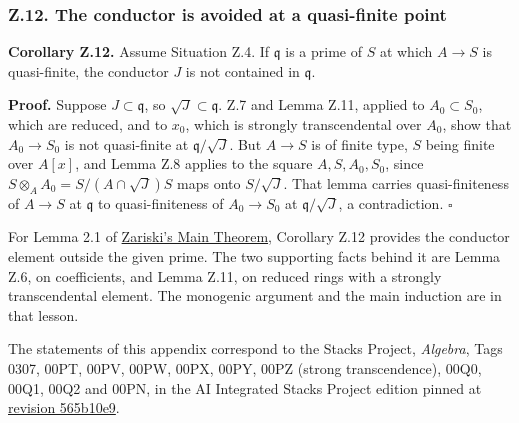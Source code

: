 \documentclass[11pt]{article}
\begin{document}
\subsubsection{Z.12. The conductor is avoided at a quasi-finite
point}\label{z.12.-the-conductor-is-avoided-at-a-quasi-finite-point}

\textbf{Corollary Z.12.} Assume Situation Z.4. If \(\mathfrak q\) is a
prime of \(S\) at which \(A\to S\) is quasi-finite, the conductor \(J\)
is not contained in \(\mathfrak q\).

\textbf{Proof.} Suppose \(J\subset\mathfrak q\), so
\(\sqrt J\subset\mathfrak q\). Z.7 and Lemma Z.11, applied to
\(A_0\subset S_0\), which are reduced, and to \(x_0\), which is strongly
transcendental over \(A_0\), show that \(A_0\to S_0\) is not
quasi-finite at \(\mathfrak q/\sqrt J\). But \(A\to S\) is of finite
type, \(S\) being finite over \(A[x]\), and Lemma Z.8 applies to the
square \(A,S,A_0,S_0\), since \(S\otimes_AA_0=S/(A\cap\sqrt J)S\) maps
onto \(S/\sqrt J\). That lemma carries quasi-finiteness of \(A\to S\) at
\(\mathfrak q\) to quasi-finiteness of \(A_0\to S_0\) at
\(\mathfrak q/\sqrt J\), a contradiction. \(\square\)

For Lemma 2.1 of \href{../AG-MO/AG-MO-12.html}{Zariski's Main Theorem},
Corollary Z.12 provides the conductor element outside the given prime.
The two supporting facts behind it are Lemma Z.6, on coefficients, and
Lemma Z.11, on reduced rings with a strongly transcendental element. The
monogenic argument and the main induction are in that lesson.

The statements of this appendix correspond to the Stacks Project,
\emph{Algebra}, Tags 0307, 00PT, 00PV, 00PW, 00PX, 00PY, 00PZ (strong
transcendence), 00Q0, 00Q1, 00Q2 and 00PN, in the AI Integrated Stacks
Project edition pinned at
\href{https://github.com/KokunoYumeto/unofficial-stacks-project-ai-drafts/blob/565b10e987aba5969b21145a0833f42d69f96790/algebra.tex}{revision
565b10e9}.
\end{document}
